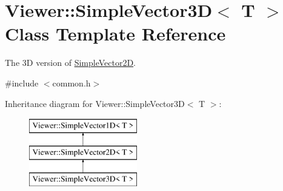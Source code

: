 \hypertarget{classViewer_1_1SimpleVector3D}{}\section{Viewer\+:\+:Simple\+Vector3D$<$ T $>$ Class Template Reference}
\label{classViewer_1_1SimpleVector3D}


The 3D version of \mbox{\hyperlink{classViewer_1_1SimpleVector2D}{Simple\+Vector2D}}.  




{\ttfamily \#include $<$common.\+h$>$}

Inheritance diagram for Viewer\+:\+:Simple\+Vector3D$<$ T $>$\+:\begin{figure}[H]
\begin{center}
\leavevmode
\includegraphics[height=3.000000cm]{classViewer_1_1SimpleVector3D}
\end{center}
\end{figure}
